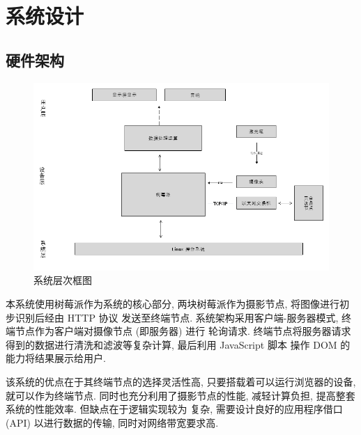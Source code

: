 \documentclass[scheme=chinese,a4paper]{article}
\begin{document}
\section{系统设计}
\subsection{硬件架构}
\begin{figure}[H]
  \centering
  \includegraphics[width=1\textwidth]{sys.png}
  \caption{系统层次框图}
\end{figure}
本系统使用树莓派作为系统的核心部分, 两块树莓派作为摄影节点, 将图像进行初步识别后经由 HTTP 协议
发送至终端节点. 系统架构采用客户端-服务器模式, 终端节点作为客户端对摄像节点 (即服务器) 进行
轮询请求. 终端节点将服务器请求得到的数据进行清洗和滤波等复杂计算, 最后利用 JavaScript 脚本
操作 DOM 的能力将结果展示给用户. 

该系统的优点在于其终端节点的选择灵活性高, 只要搭载着可以运行浏览器的设备, 就可以作为终端节点. 
同时也充分利用了摄影节点的性能, 减轻计算负担, 提高整套系统的性能效率. 但缺点在于逻辑实现较为
复杂, 需要设计良好的应用程序借口 (API) 以进行数据的传输, 同时对网络带宽要求高. 
\end{document}
